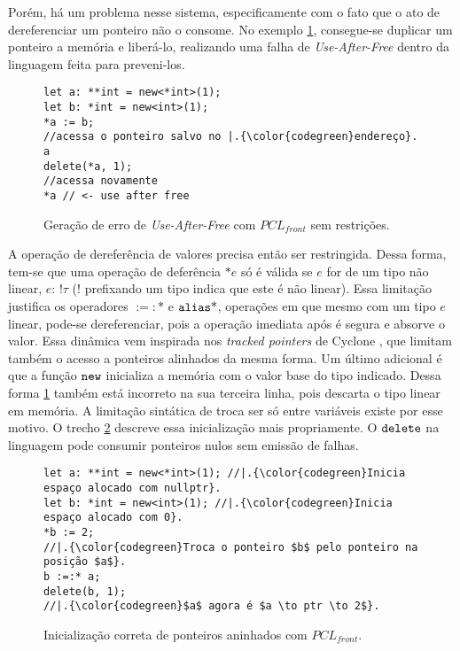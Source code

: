 Porém, há um problema nesse sistema, especificamente com o fato que o ato de dereferenciar um ponteiro não o consome. No exemplo \ref{fig:pcl-front:uaf}, consegue-se duplicar um ponteiro a memória e liberá-lo, realizando uma falha de \emph{Use-After-Free} dentro da linguagem feita para preveni-los.

\begin{figure}[ht]
	\caption{Geração de erro de \emph{Use-After-Free} com $PCL_{front}$ sem restrições.}
	\label{fig:pcl-front:uaf}
	\begin{lstlisting}[language=PCLfront]
let a: **int = new<*int>(1);
let b: *int = new<int>(1);
*a := b;
//acessa o ponteiro salvo no |.{\color{codegreen}endereço}. a
delete(*a, 1);
//acessa novamente
*a // <- use after free
	\end{lstlisting}
\end{figure}

A operação de dereferência de valores precisa então ser restringida. Dessa forma, tem-se que uma operação de deferência $\text{*}\!e$ só é válida se $e$ for de um tipo não linear, $e\!:\,!\tau$ ($!$ prefixando um tipo indica que este é não linear). Essa limitação justifica os operadores $:=:\!\!\text{*}$ e $\texttt{alias}\text{*}$, operações em que mesmo com um tipo $e$ linear, pode-se dereferenciar, pois a operação imediata após é segura e absorve o valor. Essa dinâmica vem inspirada nos \emph{tracked pointers} de Cyclone \cite[p.6]{CYCLONEMEM}, que limitam também o acesso a ponteiros alinhados da mesma forma. Um último adicional é que a função $\texttt{new}$ inicializa a memória com o valor base do tipo indicado. Dessa forma \ref{fig:pcl-front:uaf} também está incorreto na sua terceira linha, pois descarta o tipo linear em memória. A limitação sintática de troca ser só entre variáveis existe por esse motivo. O trecho \ref{fig:pcl-front:init} descreve essa inicialização mais propriamente. O $\texttt{delete}$ na linguagem pode consumir ponteiros nulos sem emissão de falhas.

\begin{figure}[ht]
	\caption{Inicialização correta de ponteiros aninhados com $PCL_{front}$.}
	\label{fig:pcl-front:init}
	\begin{lstlisting}[language=PCLfront]
let a: **int = new<*int>(1); //|.{\color{codegreen}Inicia espaço alocado com nullptr}.
let b: *int = new<int>(1); //|.{\color{codegreen}Inicia espaço alocado com 0}.
*b := 2;
//|.{\color{codegreen}Troca o ponteiro $b$ pelo ponteiro na posição $a$}. 
b :=:* a;
delete(b, 1);
//|.{\color{codegreen}$a$ agora é $a \to ptr \to 2$}. 
	\end{lstlisting}
\end{figure}

